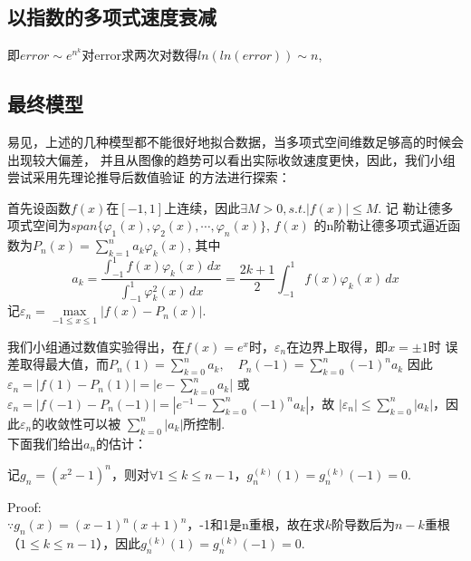 \documentclass{article}
\begin{document}
    \subsection{以指数的多项式速度衰减}
    即$error\sim e^{n^{k}}$对error求两次对数得$ln(ln(error))\sim n$,

    \subsection{最终模型}
    易见，上述的几种模型都不能很好地拟合数据，当多项式空间维数足够高的时候会出现较大偏差，
    并且从图像的趋势可以看出实际收敛速度更快，因此，我们小组尝试采用先理论推导后数值验证
    的方法进行探索：
    \par
    首先设函数$f(x)$在$[-1,1]$上连续，因此$\exists M>0, s.t. |f(x)|\leqslant M $. 记
    勒让德多项式空间为$span\{\varphi_1(x),\varphi_2(x),\cdots,\varphi_n(x)\}$, $f(x)$
    的n阶勒让德多项式逼近函数为$P_n(x)=\sum_{k=1}^{n} a_k\varphi_k(x) $, 其中
    $$a_k=\frac{\int_{-1}^{1} f(x)\varphi_k(x)\,dx}{\int_{-1}^{1} \varphi_k^2(x)\,dx}
    =\frac{2k+1}{2}\int_{-1}^{1} f(x)\varphi_k(x)\,dx
    $$
    记$\varepsilon_n=\mathop{max}\limits_{-1\leqslant x\leqslant 1}|f(x)-P_n(x)|$.\\
    \par
    我们小组通过数值实验得出，在$f(x)=e^x$时，$\varepsilon_n$在边界上取得，即$x=\pm 1$时
    误差取得最大值，而$P_n(1)=\sum_{k=0}^{n} a_k,\quad P_n(-1)=\sum_{k=0}^{n} (-1)^n a_k$
    因此$\varepsilon_n=|f(1)-P_n(1)|=|e-\sum_{k=0}^{n} a_k$| 或 
    $ \varepsilon_n=|f(-1)-P_n(-1)|=|e^{-1}-\sum_{k=0}^{n} (-1)^n a_k|$，故
    $|\varepsilon_n|\leqslant \sum_{k=0}^{n} |a_k|$，因此$\varepsilon_n$的收敛性可以被
    $\sum_{k=0}^{n} |a_k|$所控制.\\
    下面我们给出$a_n$的估计：\\
    \begin{lemma}
        记$g_n=(x^2-1)^n$，则对$\forall 1\leqslant k \leqslant n-1$，$g_n^{(k)}(1)=
        g_n^{(k)}(-1)=0$.
    \end{lemma}
    Proof:\\
    $\because g_n(x)=(x-1)^n(x+1)^n$，-1和1是n重根，故在求$k$阶导数后为$n-k$重根
    （$1\leqslant k \leqslant n-1$），因此$g_n^{(k)}(1)=g_n^{(k)}(-1)=0$.\\
\end{document}
